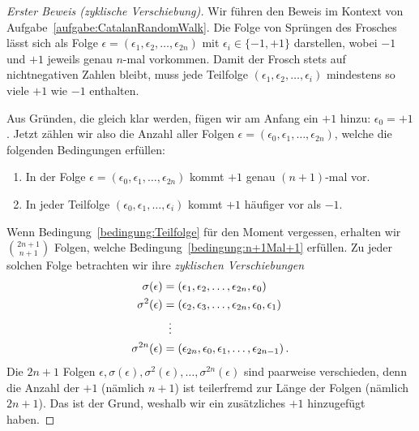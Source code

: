 \begin{proof}[Erster Beweis \textmd{(\emph{zyklische Verschiebung})}]
	Wir führen den Beweis im Kontext von Aufgabe~\ref{aufgabe:CatalanRandomWalk}. Die Folge von Sprüngen des Frosches lässt sich als Folge $\epsilon=(\epsilon_1,\epsilon_2,\dotsc,\epsilon_{2n})$ mit $\epsilon_i\in\{-1,+1\}$ darstellen, wobei $-1$ und $+1$ jeweils genau $n$-mal vorkommen. Damit der Frosch stets auf nichtnegativen Zahlen bleibt, muss jede Teilfolge $(\epsilon_1,\epsilon_2,\dotsc,\epsilon_i)$ mindestens so viele $+1$ wie $-1$ enthalten. 
	
	Aus Gründen, die gleich klar werden, fügen wir am Anfang ein $+1$ hinzu: $\epsilon_0=+1$. Jetzt zählen wir also die Anzahl aller Folgen $\epsilon=(\epsilon_0,\epsilon_1,\dotsc,\epsilon_{2n})$, welche die folgenden Bedingungen erfüllen:
	\begin{enumerate}[label={$(\Alph*)$},ref={$(\Alph*)$}]
		\item In der Folge $\epsilon=(\epsilon_0,\epsilon_1,\dotsc,\epsilon_{2n})$ kommt $+1$ genau $(n+1)$-mal vor.\label{bedingung:n+1Mal+1}
		\item In jeder Teilfolge $(\epsilon_0,\epsilon_1,\dotsc,\epsilon_i)$ kommt $+1$ häufiger vor als $-1$.\label{bedingung:Teilfolge}
	\end{enumerate}
	
	Wenn Bedingung~\ref{bedingung:Teilfolge} für den Moment vergessen, erhalten wir $\binom{2n+1}{n+1}$ Folgen, welche Bedingung~\ref{bedingung:n+1Mal+1} erfüllen. Zu jeder solchen Folge betrachten wir ihre \emph{zyklischen Verschiebungen}
	\begin{align*}
		\sigma(\epsilon)&=(\epsilon_1,\epsilon_2,\dotsc,\epsilon_{2n},\epsilon_0)\\
		\sigma^2(\epsilon)&=(\epsilon_2,\epsilon_3,\dotsc,\epsilon_{2n},\epsilon_0,\epsilon_1)\\
		&\mathrel{\tikz[inner sep=0,outer sep=0]{\node at (0,-0.5ex) {$\phantom{=}$};\node at (0,0) {$\vdots$};}}\\
		\sigma^{2n}(\epsilon)&=(\epsilon_{2n},\epsilon_0,\epsilon_1,\dotsc,\epsilon_{2n-1})\,.
	\end{align*}
	Die $2n+1$ Folgen $\epsilon,\sigma(\epsilon),\sigma^2(\epsilon),\dotsc,\sigma^{2n}(\epsilon)$ sind paarweise verschieden, denn die Anzahl der $+1$ (nämlich $n+1$) ist teilerfremd zur Länge der Folgen (nämlich $2n+1$). Das ist der Grund, weshalb wir ein zusätzliches $+1$ hinzugefügt haben.
	

\end{proof}

